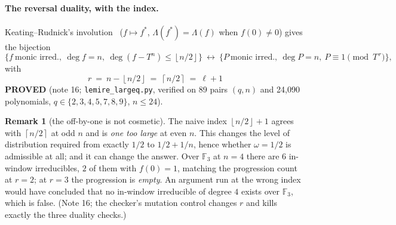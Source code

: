 \documentclass[10pt]{article}
\theoremstyle{plain}
\theoremstyle{definition}
\newtheorem{remark}[theorem]{Remark}
\newcommand{\F}{\mathbb F}
\newcommand{\Lam}{\Lambda}
\newcommand{\ceil}[1]{\left\lceil #1\right\rceil}
\newcommand{\flr}[1]{\left\lfloor #1\right\rfloor}
\newcommand{\proved}{\textcolor{proved}{\textsf{\textbf{\footnotesize PROVED}}}}
\begin{document}
\paragraph{The reversal duality, with the index.}
Keating--Rudnick's involution~\cite{KR} ($f\mapsto f^*$, $\Lam(f^*)=\Lam(f)$
when $f(0)\ne0$) gives the bijection
\[
 \{f\ \text{monic irred.},\ \deg f=n,\ \deg(f-T^n)\le\flr{n/2}\}
 \ \longleftrightarrow\
 \{P\ \text{monic irred.},\ \deg P=n,\ P\equiv1\!\!\pmod{T^{\,r}}\},
\]
with
\[
 \boxed{\ r\ =\ n-\flr{n/2}\ =\ \ceil{n/2}\ =\ \ell+1\ }
\]
\proved{} (note 16; \texttt{lemire\_largeq.py}, verified on 89 pairs $(q,n)$
and 24{,}090 polynomials, $q\in\{2,3,4,5,7,8,9\}$, $n\le24$).

\begin{remark}[the off-by-one is not cosmetic]
The naive index $\flr{n/2}+1$ agrees with $\ceil{n/2}$ at odd $n$ and is
\emph{one too large} at even $n$. This changes the level of distribution
required from exactly $1/2$ to $1/2+1/n$, hence whether $\omega=1/2$ is
admissible at all; and it can change the answer. Over $\F_3$ at $n=4$ there
are $6$ in-window irreducibles, $2$ of them with $f(0)=1$, matching the
progression count at $r=2$; at $r=3$ the progression is \emph{empty}. An
argument run at the wrong index would have concluded that no in-window
irreducible of degree $4$ exists over $\F_3$, which is false. (Note 16; the
checker's mutation control changes $r$ and kills exactly the three duality
checks.)
\end{remark}
\end{document}
